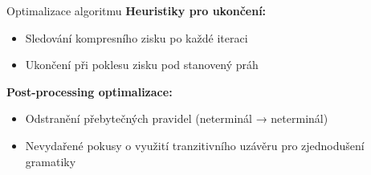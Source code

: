 \documentclass[lualatex,hyperref={pdfencoding=auto}]{beamer}
\begin{document}
\begin{frame}{Optimalizace algoritmu}
    \textbf{Heuristiky pro ukončení:}
    \begin{itemize}
        \item Sledování kompresního zisku po každé iteraci
        \item Ukončení při poklesu zisku pod stanovený práh
    \end{itemize}
    
    \vspace{10pt}
    \textbf{Post-processing optimalizace:}
    \begin{itemize}
        \item Odstranění přebytečných pravidel (neterminál → neterminál)
        \item Nevydařené pokusy o využití tranzitivního uzávěru pro zjednodušení gramatiky
    \end{itemize}
    
\end{frame}
\end{document}
